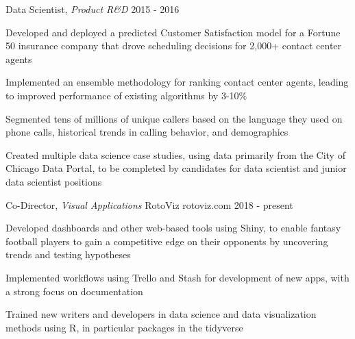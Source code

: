 \begin{cventries}
  \cventry
    {Data Scientist, \textit{Product R\&D}} %
    {} %
    {} %
    {2015 - 2016} %
    {
      \begin{cvitems} %
        \item {Developed and deployed a predicted Customer Satisfaction model for a Fortune 50 insurance company that drove scheduling decisions for 2,000+ contact center agents}
        \item {Implemented an ensemble methodology for ranking contact center agents, leading to improved performance of existing algorithms by 3-10\%}
        \item {Segmented tens of millions of unique callers based on the language they used on phone calls, historical trends in calling behavior, and demographics}
        \item {Created multiple data science case studies, using data primarily from the City of Chicago Data Portal, to be completed by candidates for data scientist and junior data scientist positions}
      \end{cvitems}
    }

 \cventry
 {Co-Director, \textit{Visual Applications}}
 {RotoViz}
 {rotoviz.com}
 {2018 - present}
 {
   \begin{cvitems}
   \item {Developed dashboards and other web-based tools using Shiny, to enable fantasy football players to gain a competitive edge on their opponents by uncovering trends and testing hypotheses}
   \item {Implemented workflows using Trello and Stash for development of new apps, with a strong focus on documentation}
   \item {Trained new writers and developers in data science and data visualization methods using R, in particular packages in the tidyverse}
   \end{cvitems}
   }
   

\end{cventries}
